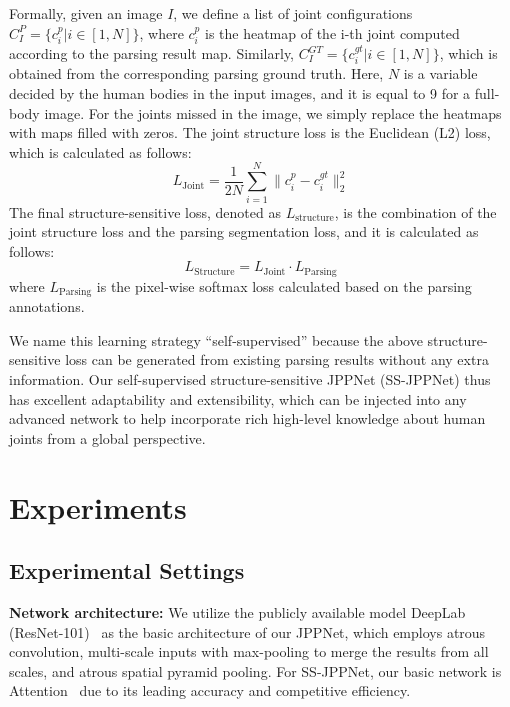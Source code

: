 \documentclass[10pt,journal,compsoc]{IEEEtran}
\begin{document}
Formally, given an image $I$, we define a list of joint configurations $C^{P}_I = \{c^{p}_i|i\in[1,N]\}$, where $c^{p}_i$ is the heatmap of the i-th joint computed according to the parsing result map. Similarly, $C^{GT}_I = \{c^{gt}_i|i\in[1,N]\}$, which is obtained from the corresponding parsing ground truth. Here, $N$ is a variable decided by the human bodies in the input images, and it is equal to 9 for a full-body image. For the joints missed in the image, we simply replace the heatmaps with maps filled with zeros. The joint structure loss is the Euclidean (L2) loss, which is calculated as follows:
\begin{equation}
L_{\text{Joint}} = \frac{1}{2N} \sum \limits_{i=1}^N \| c^{p}_i - c_i^{gt} \|_2^2
\end{equation}
The final structure-sensitive loss, denoted as $L_{\text{structure}}$, is the combination of the joint structure loss and the parsing segmentation loss, and it is calculated as follows:
\begin{equation}
L_{\text{Structure}} = L_{\text{Joint}} \cdot L_{\text{Parsing}}
\end{equation}
where $L_{\text{Parsing}}$ is the pixel-wise softmax loss calculated based on the parsing annotations.

We name this learning strategy ``self-supervised'' because the above structure-sensitive loss can be generated from existing parsing results without any extra information. Our self-supervised structure-sensitive JPPNet (SS-JPPNet) thus has excellent adaptability and extensibility, which can be injected into any advanced network to help incorporate rich high-level knowledge about human joints from a global perspective. 







\section{Experiments}
\subsection{Experimental Settings}
\textbf{Network architecture: }
We utilize the publicly available model DeepLab (ResNet-101)~\cite{chen2016deeplab} as the basic architecture of our JPPNet, which employs atrous convolution, multi-scale inputs with max-pooling to merge the results from all scales, and atrous spatial pyramid pooling. For SS-JPPNet, our basic network is Attention~\cite{chen2015attention} due to its leading accuracy and competitive efficiency.
\end{document}
